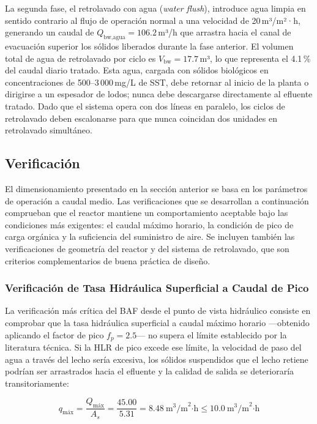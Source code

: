 \documentclass[12pt,a4paper]{article}
\newcommand{\captionequation}[1]{\vspace{-0.5em}\caption*{#1}\vspace{0.5em}}
\begin{document}
La segunda fase, el retrolavado con agua (\textit{water flush}), introduce agua limpia en sentido contrario al flujo de operación normal a una velocidad de 20\,m³/m²·h, generando un caudal de $Q_{\text{bw,agua}} = 106.2$\,m³/h que arrastra hacia el canal de evacuación superior los sólidos liberados durante la fase anterior. El volumen total de agua de retrolavado por ciclo es $V_{\text{bw}} = 17.7$\,m³, lo que representa el 4.1\,\% del caudal diario tratado. Esta agua, cargada con sólidos biológicos en concentraciones de 500--3\,000\,mg/L de SST, debe retornar al inicio de la planta o dirigirse a un espesador de lodos; nunca debe descargarse directamente al efluente tratado. Dado que el sistema opera con dos líneas en paralelo, los ciclos de retrolavado deben escalonarse para que nunca coincidan dos unidades en retrolavado simultáneo.

\subsection{Verificación}

El dimensionamiento presentado en la sección anterior se basa en los parámetros de operación a caudal medio. Las verificaciones que se desarrollan a continuación comprueban que el reactor mantiene un comportamiento aceptable bajo las condiciones más exigentes: el caudal máximo horario, la condición de pico de carga orgánica y la suficiencia del suministro de aire. Se incluyen también las verificaciones de geometría del reactor y del sistema de retrolavado, que son criterios complementarios de buena práctica de diseño.

\subsubsection*{Verificación de Tasa Hidráulica Superficial a Caudal de Pico}

La verificación más crítica del BAF desde el punto de vista hidráulico consiste en comprobar que la tasa hidráulica superficial a caudal máximo horario —obtenido aplicando el factor de pico $f_p = 2.5$— no supera el límite establecido por la literatura técnica. Si la HLR de pico excede ese límite, la velocidad de paso del agua a través del lecho sería excesiva, los sólidos suspendidos que el lecho retiene podrían ser arrastrados hacia el efluente y la calidad de salida se deterioraría transitoriamente:

\begin{equation}
q_{\text{máx}} = \frac{Q_{\text{máx}}}{A_{s}} = \frac{45.00}{5.31} = 8.48\ \text{m}^3\text{/m}^2\text{·h} \leq 10.0\ \text{m}^3\text{/m}^2\text{·h}
\end{equation}
\captionequation{HLR a caudal máximo horario}
\end{document}
